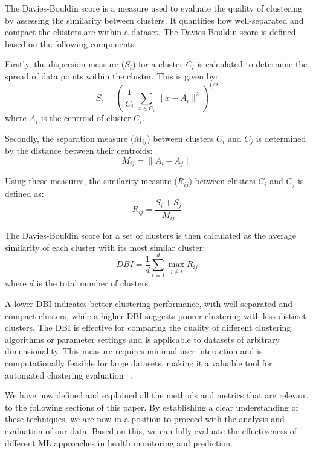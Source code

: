 The Davies-Bouldin score is a measure used to evaluate the quality of clustering by assessing the similarity between clusters. It quantifies how well-separated and compact the clusters are within a dataset. The Davies-Bouldin score is defined based on the following components:

Firstly, the dispersion measure (\( S_i \)) for a cluster \( C_i \) is calculated to determine the spread of data points within the cluster. This is given by:
\[ 
S_i = \left( \frac{1}{|C_i|} \sum_{x \in C_i} \| x - A_i \|^2 \right)^{1/2} 
\]
where \( A_i \) is the centroid of cluster \( C_i \).

Secondly, the separation measure (\( M_{ij} \)) between clusters \( C_i \) and \( C_j \) is determined by the distance between their centroids:
\[ 
M_{ij} = \| A_i - A_j \| 
\]

Using these measures, the similarity measure (\( R_{ij} \)) between clusters \( C_i \) and \( C_j \) is defined as:
\[ 
R_{ij} = \frac{S_i + S_j}{M_{ij}} 
\]

The Davies-Bouldin score for a set of clusters is then calculated as the average similarity of each cluster with its most similar cluster:
\[ 
DBI = \frac{1}{d} \sum_{i=1}^{d} \max_{j \neq i} R_{ij} 
\]
where \( d \) is the total number of clusters.

A lower DBI indicates better clustering performance, with well-separated and compact clusters, while a higher DBI suggests poorer clustering with less distinct clusters. The DBI is effective for comparing the quality of different clustering algorithms or parameter settings and is applicable to datasets of arbitrary dimensionality. This measure requires minimal user interaction and is computationally feasible for large datasets, making it a valuable tool for automated clustering evaluation
~\cite{4766909}.

We have now defined and explained all the methods and metrics that are relevant to the following sections of this paper. By establishing a clear understanding of these techniques, we are now in a position to proceed with the analysis and evaluation of our data. Based on this, we can fully evaluate the effectiveness of different ML approaches in health monitoring and prediction.
